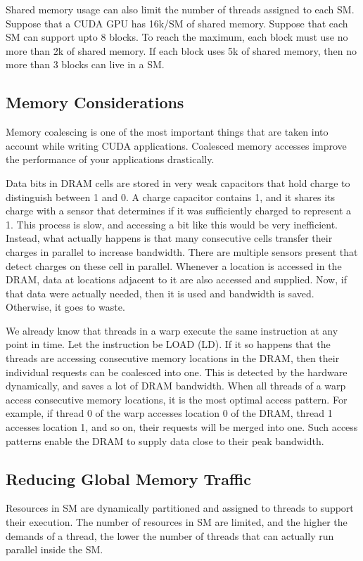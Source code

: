 \documentclass[../notes.tex]{subfiles}
\begin{document}
Shared memory usage can also limit the number of threads assigned to each SM. Suppose that a CUDA GPU has 16k/SM of shared memory. Suppose that each SM can support upto 8 blocks. To reach the maximum, each block must use no more than 2k of shared memory. If each block uses 5k of shared memory, then no more than 3 blocks can live in a SM.

\subsection{Memory Considerations}
Memory coalescing is one of the most important things that are taken into account while writing CUDA applications. Coalesced memory accesses improve the performance of your applications drastically.

Data bits in DRAM cells are stored in very weak capacitors that hold charge to distinguish between 1 and 0. A charge capacitor contains 1, and it shares its charge with a sensor that determines if it was sufficiently charged to represent a 1. This process is slow, and accessing a bit like this would be very inefficient. Instead, what actually happens is that many consecutive cells transfer their charges in parallel to increase bandwidth. There are multiple sensors present that detect charges on these cell in parallel. Whenever a location is accessed in the DRAM, data at locations adjacent to it are also accessed and supplied. Now, if that data were actually needed, then it is used and bandwidth is saved. Otherwise, it goes to waste.

We already know that threads in a warp execute the same instruction at any point in time. Let the instruction be LOAD (LD). If it so happens that the threads are accessing consecutive memory locations in the DRAM, then their individual requests can be coalesced into one. This is detected by the hardware dynamically, and saves a lot of DRAM bandwidth. When all threads of a warp access consecutive memory locations, it is the most optimal access pattern. For example, if thread 0 of the warp accesses location 0 of the DRAM, thread 1 accesses location 1, and so on, their requests will be merged into one. Such access patterns enable the DRAM to supply data close to their peak bandwidth.

\subsection{Reducing Global Memory Traffic}
Resources in SM are dynamically partitioned and assigned to threads to support their execution. The number of resources in SM are limited, and the higher the demands of a thread, the lower the number of threads that can actually run parallel inside the SM.
\end{document}
